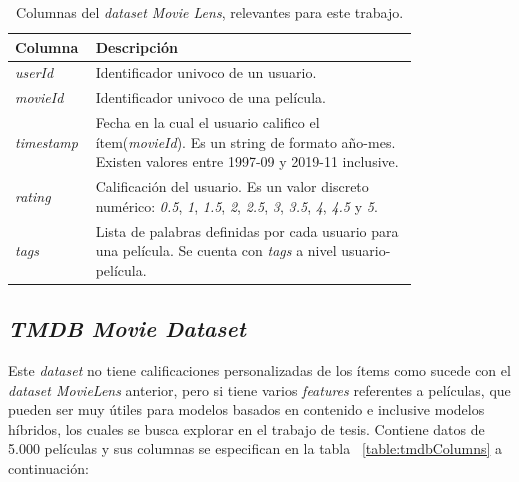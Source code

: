 \documentclass[11pt,a4paper,twoside]{thesis}
\begin{document}
\begin{table}[!htb]
	\centering
	\footnotesize
	\begin{tabular}{l | p{0.8\linewidth}}
		\hline
		Columna            & Descripción                                                                                                                                                                                 \\
		\hline
		\textit{userId}    & Identificador univoco de un usuario.                                                                                                                                                        \\
		\textit{movieId}   & Identificador univoco de una película.                                                                                                                                                      \\
		\textit{timestamp} & Fecha en la cual el usuario califico el ítem(\textit{movieId}). Es un string de formato año-mes. Existen valores entre 1997-09 y 2019-11 inclusive.                                         \\
		\textit{rating}    & Calificación del usuario. Es un valor discreto numérico: \textit{0.5}, \textit{1}, \textit{1.5}, \textit{2}, \textit{2.5}, \textit{3}, \textit{3.5}, \textit{4}, \textit{4.5} y \textit{5}. \\
		\textit{tags}      & Lista de palabras definidas por cada usuario para una película. Se cuenta con \textit{tags} a nivel usuario-película.                                                                       \\
		\hline
	\end{tabular}
	\caption{
		Columnas del \textit{dataset} \textit{Movie Lens}, relevantes para este trabajo.
	}
	\label{table:movieLensColumns}
\end{table}

\clearpage

\subsection{\textit{TMDB Movie Dataset}}

Este \textit{dataset} \cite{tmdb} no tiene calificaciones personalizadas de los
ítems como sucede con el \textit{dataset MovieLens} anterior, pero si tiene
varios \textit{features} referentes a películas, que pueden ser muy útiles para
modelos basados en contenido e inclusive modelos híbridos, los cuales se busca
explorar en el trabajo de tesis. Contiene datos de 5.000 películas y sus
columnas se especifican en la tabla ~\ref{table:tmdbColumns} a continuación:
\end{document}
